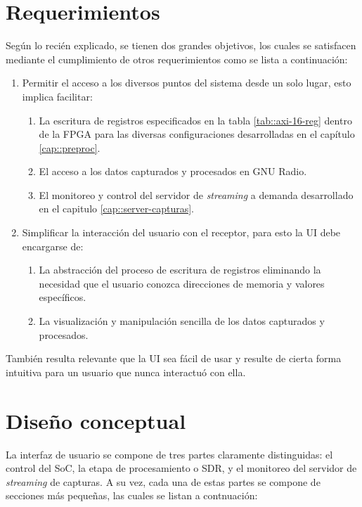 \documentclass[../../main.tex]{subfiles}
\begin{document}
\section{Requerimientos}\label{sec::ui-reqs}
Según lo recién explicado, se tienen dos grandes objetivos, los cuales se satisfacen mediante el cumplimiento de otros requerimientos como se lista a continuación:
\begin{enumerate}
    \item Permitir el acceso a los diversos puntos del sistema desde un solo lugar, esto implica facilitar:
    \begin{enumerate}
        \item La escritura de registros especificados en la tabla \ref{tab::axi-16-reg} dentro de la FPGA para las diversas configuraciones desarrolladas en el capítulo \ref{cap::preproc}.
        \item El acceso a los datos capturados y procesados en GNU Radio.
        \item El monitoreo y control del servidor de \textit{streaming} a demanda desarrollado en el capitulo \ref{cap::server-capturas}.
    \end{enumerate}
    \item Simplificar la interacción del usuario con el receptor, para esto la UI debe encargarse de:
    \begin{enumerate}
        \item La abstracción del proceso de escritura de registros eliminando la necesidad que el usuario conozca direcciones de memoria y valores específicos.
        \item La visualización y manipulación sencilla de los datos capturados y procesados.
    \end{enumerate}
\end{enumerate}

También resulta relevante que la UI sea fácil de usar y resulte de cierta forma intuitiva para un usuario que nunca interactuó con ella.

\section{Diseño conceptual}\label{sec::disenio-conceptual}
La interfaz de usuario se compone de tres partes claramente distinguidas: el control del SoC, la etapa de procesamiento o SDR, y el monitoreo del servidor de \textit{streaming} de capturas. A su vez, cada una de estas partes se compone de secciones más pequeñas, las cuales se listan a contnuación:
\end{document}
